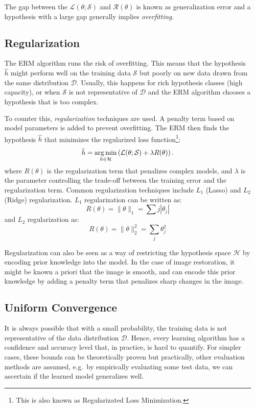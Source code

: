 The gap between the $\mathcal{L}(\theta; \mathcal{S})$ and $\mathcal{R}(\theta)$ is known as generalization error and a hypothesis with a large gap generally implies \textit{overfitting}.

\subsection{Regularization}
The \gls{ERM} algorithm runs the risk of overfitting. This means that the hypothesis $\hat{h}$ might perform well on the training data $\mathcal{S}$ but poorly on new data drawn from the same distribution $\mathcal{D}$. Usually, this happens for rich hypothesis classes (high capacity), or when $\mathcal{S}$ is not representative of $\mathcal{D}$ and the \gls{ERM} algorithm chooses a hypothesis that is too complex. 

To counter this, \textit{regularization} techniques are used. A penalty term based on model parameters is added to prevent overfitting. The \gls{ERM} then finds the hypothesis $\hat{h}$ that minimizes the regularized loss function\footnote{This is also known as Regularizated Loss Minimization.}:
\begin{equation}
    \hat{h} = \operatorname*{arg\,min}_{h \in \mathcal{H}} \left(\mathcal{L}(\theta; \mathcal{S})  + \lambda R(\theta) \right).
\end{equation}
where $R(\theta)$ is the regularization term that penalizes complex models, and $\lambda$ is the parameter controlling the trade-off between the training error and the regularization term. Common regularization techniques include $L_1$ (Lasso) and $L_2$ (Ridge) regularization. $L_1$ regularization can be written as:
\begin{equation*}
    R(\theta) = \|\theta\|_1 = \sum{j} |\theta_j|
\end{equation*}
and $L_2$ regularization as:
\begin{equation*}
    R(\theta) = \|\theta\|^2_2 = \sum_{j} \theta_j^2
\end{equation*}

Regularization can also be seen as a way of restricting the hypothesis space $\mathcal{H}$ by encoding prior knowledge into the model. In the case of image restoration, it might be known a priori that the image is smooth, and  can encode this prior knowledge by adding a penalty term that penalizes sharp changes in the image.


\subsection{Uniform Convergence}
It is always possible that with a small probability, the training data is not representative of the data distribution $\mathcal{D}$. Hence, every learning algorithm has a confidence and accuracy level that, in practice, is hard to quantify. For simpler cases, these bounds can be theoretically proven but practically, other evaluation methods are assumed, e.g.\ by empirically evaluating some test data, we can ascertain if the learned model generalizes well.

